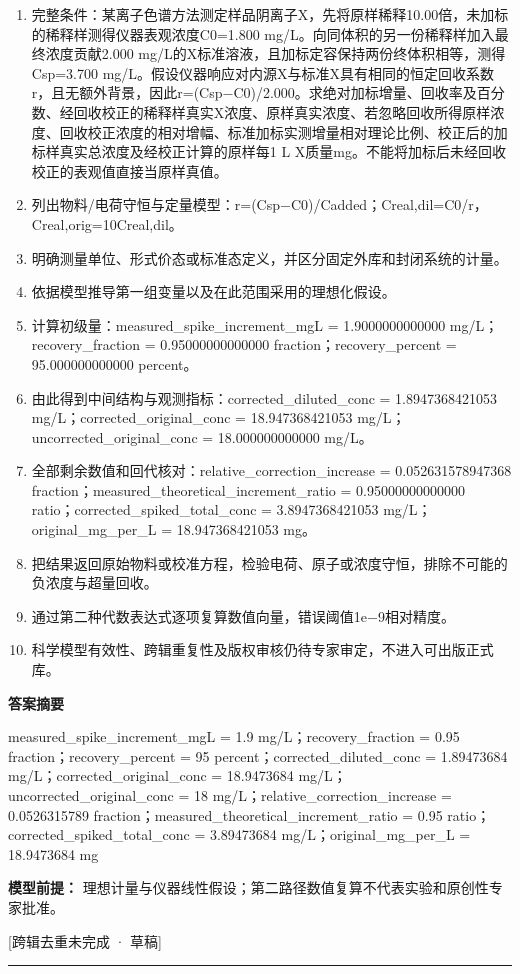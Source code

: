 \documentclass[UTF8,11pt,a4paper]{ctexart}
\begin{document}
\begin{enumerate}
\item 完整条件：某离子色谱方法测定样品阴离子X，先将原样稀释10.00倍，未加标的稀释样测得仪器表观浓度C0=1.800 mg/L。向同体积的另一份稀释样加入最终浓度贡献2.000 mg/L的X标准溶液，且加标定容保持两份终体积相等，测得Csp=3.700 mg/L。假设仪器响应对内源X与标准X具有相同的恒定回收系数r，且无额外背景，因此r=(Csp−C0)/2.000。求绝对加标增量、回收率及百分数、经回收校正的稀释样真实X浓度、原样真实浓度、若忽略回收所得原样浓度、回收校正浓度的相对增幅、标准加标实测增量相对理论比例、校正后的加标样真实总浓度及经校正计算的原样每1 L X质量mg。不能将加标后未经回收校正的表观值直接当原样真值。
\item 列出物料/电荷守恒与定量模型：r=(Csp−C0)/Cadded；Creal,dil=C0/r，Creal,orig=10Creal,dil。
\item 明确测量单位、形式价态或标准态定义，并区分固定外库和封闭系统的计量。
\item 依据模型推导第一组变量以及在此范围采用的理想化假设。
\item 计算初级量：measured\_spike\_increment\_mgL = 1.9000000000000 mg/L；recovery\_fraction = 0.95000000000000 fraction；recovery\_percent = 95.000000000000 percent。
\item 由此得到中间结构与观测指标：corrected\_diluted\_conc = 1.8947368421053 mg/L；corrected\_original\_conc = 18.947368421053 mg/L；uncorrected\_original\_conc = 18.000000000000 mg/L。
\item 全部剩余数值和回代核对：relative\_correction\_increase = 0.052631578947368 fraction；measured\_theoretical\_increment\_ratio = 0.95000000000000 ratio；corrected\_spiked\_total\_conc = 3.8947368421053 mg/L；original\_mg\_per\_L = 18.947368421053 mg。
\item 把结果返回原始物料或校准方程，检验电荷、原子或浓度守恒，排除不可能的负浓度与超量回收。
\item 通过第二种代数表达式逐项复算数值向量，错误阈值1e−9相对精度。
\item 科学模型有效性、跨辑重复性及版权审核仍待专家审定，不进入可出版正式库。
\end{enumerate}
\noindent\textbf{答案摘要}\par
measured\_spike\_increment\_mgL = 1.9 mg/L；recovery\_fraction = 0.95 fraction；recovery\_percent = 95 percent；corrected\_diluted\_conc = 1.89473684 mg/L；corrected\_original\_conc = 18.9473684 mg/L；uncorrected\_original\_conc = 18 mg/L；relative\_correction\_increase = 0.0526315789 fraction；measured\_theoretical\_increment\_ratio = 0.95 ratio；corrected\_spiked\_total\_conc = 3.89473684 mg/L；original\_mg\_per\_L = 18.9473684 mg\par
\noindent\textbf{模型前提：}
理想计量与仪器线性假设；第二路径数值复算不代表实验和原创性专家批准。\par
\noindent\textcolor{red!65!black}{[跨辑去重未完成 · 草稿]} \par
\medskip\hrule\medskip
{}
\end{document}
